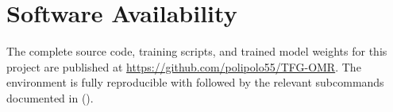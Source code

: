 \chapter{Software Availability}
\label{app:code}

The complete source code, training scripts, and trained model weights for this project are published at \url{https://github.com/polipolo55/TFG-OMR}.
The environment is fully reproducible with  followed by the relevant  subcommands documented in  ().